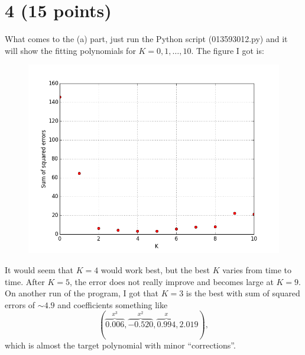 \documentclass[10pt]{article}
\begin{document}
\section*{4 (15 points)}
What comes to the (a) part, just run the Python script (013593012.py) and it will show the fitting polynomials for $K = 0, 1, \dots, 10$. The figure I got is:
\begin{figure}
\begin{center}
\includegraphics[scale=0.7]{CrossValidation}
\end{center}
\end{figure}
It would seem that $K = 4$ would work best, but the best $K$ varies from time to time. After $K = 5$, the error does not really improve and becomes large at $K = 9$. On another run of the program, I got that $K = 3$ is the best with sum of squared errors of $\sim 4.9$ and coefficients something like 
\[
(\overbrace{0.006}^{x^3}, \overbrace{-0.520}^{x^2}, \overbrace{0.994}^{x}, 2.019),
\] 
which is almost the target polynomial with minor ``corrections''.
\end{document}

